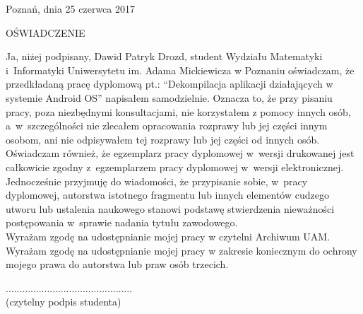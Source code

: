 \documentclass[12pt,a4paper,leqno,oneside,titlepage]{book}
\newcommand{\myAuthorName}{Dawid Patryk Drozd}
\begin{document}
\begin{flushright}{
Poznań, dnia 25 czerwca 2017
}\end{flushright}
\begin{center}{
\par
\vspace{1.5cm plus 1.5fill}
{\large OŚWIADCZENIE}
}\end{center}
\par
\vspace{1.5cm plus 1.5fill}
Ja, niżej podpisany, \myAuthorName{}, student Wydziału Matematyki i~Informatyki Uniwersytetu im. Adama Mickiewicza w Poznaniu oświadczam, że przedkładaną pracę dyplomową pt.: ``Dekompilacja aplikacji działających w systemie Android OS'' napisałem samodzielnie. Oznacza to, że przy pisaniu pracy, poza niezbędnymi konsultacjami, nie korzystałem z pomocy innych osób, a~w~szczególności nie zlecałem opracowania rozprawy lub jej części innym osobom, ani nie odpisywałem tej rozprawy lub jej części od innych osób.\\

Oświadczam również, że egzemplarz pracy dyplomowej w~wersji drukowanej jest całkowicie zgodny z~egzemplarzem pracy dyplomowej w~wersji elektronicznej.\\

Jednocześnie przyjmuję do wiadomości, że przypisanie sobie, w~pracy dyplomowej, autorstwa istotnego fragmentu lub innych elementów cudzego utworu lub ustalenia naukowego stanowi podstawę  stwierdzenia  nieważności postępowania w~sprawie nadania tytułu zawodowego.\\

Wyrażam zgodę na udostępnianie mojej pracy w czytelni Archiwum UAM.\\

Wyrażam zgodę na udostępnianie mojej pracy w zakresie koniecznym do ochrony mojego prawa do autorstwa lub praw osób trzecich.
\par
\vspace{1.5cm plus 1.5fill}
\begin{center}{
..............................................\\
{\footnotesize(czytelny podpis studenta)}
}\end{center}


\end{document}
